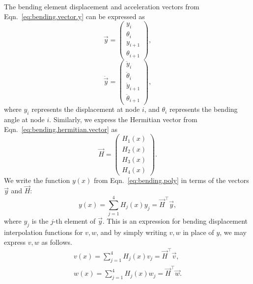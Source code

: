 The bending element displacement and acceleration vectors from Eqn.~\ref{eq:bending.vector.y} can be expressed as
\begin{equation}
\vec y = 
\begin{pmatrix}
y_i \\
\theta_i \\
y_{i+1} \\
\theta_{i+1}
\end{pmatrix},
\end{equation}
\begin{equation}
\ddot{\vec y} = 
\begin{pmatrix}
\ddot y_i \\
\ddot\theta_i \\
\ddot y_{i+1} \\
\ddot\theta_{i+1}
\end{pmatrix},
\end{equation}
where $y_i$ represents the displacement at node $i$, and $\theta_i$ represents the bending angle at node $i$. Similarly, we express the Hermitian vector from Eqn.~\ref{eq:bending.hermitian.vector} as
\begin{equation}
\vec{H} = 
\begin{pmatrix}
H_1(x) \\
H_2(x) \\
H_3(x) \\
H_4(x)
\end{pmatrix}.
\end{equation}
We write the function $y(x)$ from Eqn.~\ref{eq:bending.poly} in terms of the vectors $\vec{y}$ and $\vec H$:
\begin{equation}
y(x) = \sum_{j=1}^4 H_j(x)y_j = \vec{H}^\top \vec{y},
\end{equation}
where $y_j$ is the $j$-th element of $\vec{y}$. This is an expression for bending displacement interpolation functions for $v,w$, and by simply writing $v,w$ in place of $y$, we may express $v,w$ as follows.
\begin{eqnarray}
v(x) = \sum_{j=1}^4 H_j(x)v_j = \vec{H}^\top \vec{v}, \\
w(x) = \sum_{j=1}^4 H_j(x)w_j = \vec{H}^\top \vec{w}.
\end{eqnarray}

